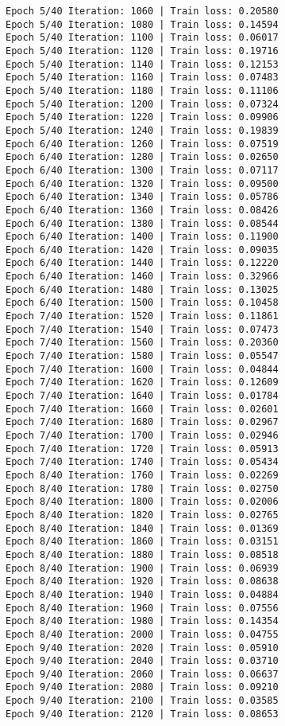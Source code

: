 \documentclass[11pt]{article}
\begin{document}
\begin{Verbatim}[commandchars=\\\{\}]
Epoch 5/40 Iteration: 1060 | Train loss: 0.20580
Epoch 5/40 Iteration: 1080 | Train loss: 0.14594
Epoch 5/40 Iteration: 1100 | Train loss: 0.06017
Epoch 5/40 Iteration: 1120 | Train loss: 0.19716
Epoch 5/40 Iteration: 1140 | Train loss: 0.12153
Epoch 5/40 Iteration: 1160 | Train loss: 0.07483
Epoch 5/40 Iteration: 1180 | Train loss: 0.11106
Epoch 5/40 Iteration: 1200 | Train loss: 0.07324
Epoch 5/40 Iteration: 1220 | Train loss: 0.09906
Epoch 5/40 Iteration: 1240 | Train loss: 0.19839
Epoch 6/40 Iteration: 1260 | Train loss: 0.07519
Epoch 6/40 Iteration: 1280 | Train loss: 0.02650
Epoch 6/40 Iteration: 1300 | Train loss: 0.07117
Epoch 6/40 Iteration: 1320 | Train loss: 0.09500
Epoch 6/40 Iteration: 1340 | Train loss: 0.05786
Epoch 6/40 Iteration: 1360 | Train loss: 0.08426
Epoch 6/40 Iteration: 1380 | Train loss: 0.08544
Epoch 6/40 Iteration: 1400 | Train loss: 0.11900
Epoch 6/40 Iteration: 1420 | Train loss: 0.09035
Epoch 6/40 Iteration: 1440 | Train loss: 0.12220
Epoch 6/40 Iteration: 1460 | Train loss: 0.32966
Epoch 6/40 Iteration: 1480 | Train loss: 0.13025
Epoch 6/40 Iteration: 1500 | Train loss: 0.10458
Epoch 7/40 Iteration: 1520 | Train loss: 0.11861
Epoch 7/40 Iteration: 1540 | Train loss: 0.07473
Epoch 7/40 Iteration: 1560 | Train loss: 0.20360
Epoch 7/40 Iteration: 1580 | Train loss: 0.05547
Epoch 7/40 Iteration: 1600 | Train loss: 0.04844
Epoch 7/40 Iteration: 1620 | Train loss: 0.12609
Epoch 7/40 Iteration: 1640 | Train loss: 0.01784
Epoch 7/40 Iteration: 1660 | Train loss: 0.02601
Epoch 7/40 Iteration: 1680 | Train loss: 0.02967
Epoch 7/40 Iteration: 1700 | Train loss: 0.02946
Epoch 7/40 Iteration: 1720 | Train loss: 0.05913
Epoch 7/40 Iteration: 1740 | Train loss: 0.05434
Epoch 8/40 Iteration: 1760 | Train loss: 0.02269
Epoch 8/40 Iteration: 1780 | Train loss: 0.02750
Epoch 8/40 Iteration: 1800 | Train loss: 0.02006
Epoch 8/40 Iteration: 1820 | Train loss: 0.02765
Epoch 8/40 Iteration: 1840 | Train loss: 0.01369
Epoch 8/40 Iteration: 1860 | Train loss: 0.03151
Epoch 8/40 Iteration: 1880 | Train loss: 0.08518
Epoch 8/40 Iteration: 1900 | Train loss: 0.06939
Epoch 8/40 Iteration: 1920 | Train loss: 0.08638
Epoch 8/40 Iteration: 1940 | Train loss: 0.04884
Epoch 8/40 Iteration: 1960 | Train loss: 0.07556
Epoch 8/40 Iteration: 1980 | Train loss: 0.14354
Epoch 8/40 Iteration: 2000 | Train loss: 0.04755
Epoch 9/40 Iteration: 2020 | Train loss: 0.05910
Epoch 9/40 Iteration: 2040 | Train loss: 0.03710
Epoch 9/40 Iteration: 2060 | Train loss: 0.06637
Epoch 9/40 Iteration: 2080 | Train loss: 0.09210
Epoch 9/40 Iteration: 2100 | Train loss: 0.03585
Epoch 9/40 Iteration: 2120 | Train loss: 0.08653

\end{Verbatim}
\end{document}
